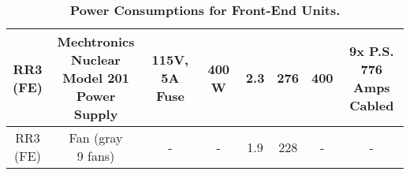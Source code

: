 \documentclass[10pt]{article}
\begin{document}
\begin{table}[h]
\begin{tabular}{|cccccccc|}
        \hline
        \makecell{RR3\\ (FE)} & \makecell{Mechtronics\\ Nuclear\\ Model 201\\ Power Supply} & \makecell{115V,\\ 5A Fuse} & 400 W & 2.3 & 276 & 400 & \makecell{9x P.S.\\ 776 Amps\\ Cabled}\\   
        \hline
        \makecell{RR3\\ (FE)} & \makecell{Fan (gray\\ 9 fans)} & - & - & 1.9 & 228 & - & - \\     
        \hline
    \end{tabular}
    \caption{\textbf{Power Consumptions for Front-End Units.} }
    \label{tab:FE}
\end{table}
\end{document}
